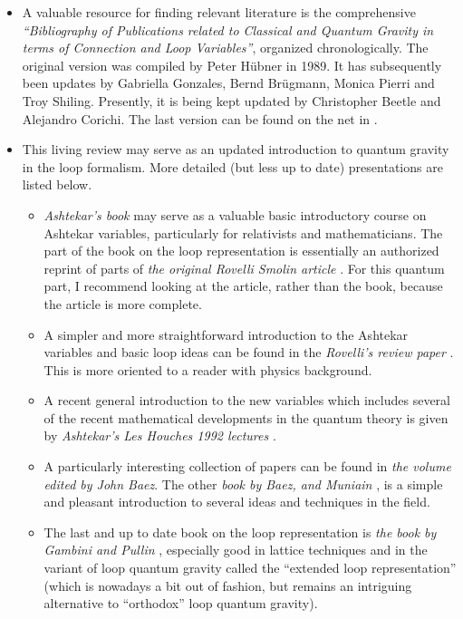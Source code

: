\begin{itemize}

\item A valuable resource for finding relevant literature is the 
comprehensive {\em ``Bibliography of Publications related to Classical 
and Quantum Gravity in terms of Connection and Loop Variables''}, 
organized chronologically.  The original version was compiled by 
Peter H\"ubner in 1989.  It has subsequently been updates by 
Gabriella Gonzales, Bernd Br\"ugmann, Monica Pierri and Troy 
Shiling.  Presently, it is being kept updated by Christopher 
Beetle and Alejandro Corichi.  The last version can be found on 
the net in \cite{Bibliography}.

\item This living review may serve as an updated introduction to 
quantum gravity in the loop formalism. More detailed (but less 
up to date) presentations are listed below. 
\begin{itemize}

\item {\em Ashtekar's book} \cite{AshtekarBook} may serve as a valuable 
basic introductory course on Ashtekar variables, particularly for 
relativists and mathematicians.  The part of the book on the loop 
representation is essentially an authorized reprint of parts of 
{\em the original Rovelli Smolin article} \cite{RovelliSmolin90}.  For 
this quantum part, I recommend looking at the article, rather 
than the book, because the article is more complete.

\item A simpler and more straightforward introduction to the 
Ashtekar variables and basic loop ideas can be found in the 
{\em Rovelli's review paper} \cite{Rovelli91}.  This is more oriented 
to a reader with physics background.

\item A recent general introduction to the new variables which 
includes several of the recent mathematical developments in the 
quantum theory is given by {\em Ashtekar's Les Houches 1992 lectures}  
\cite{AshtekarLesHouches}.

\item A particularly interesting collection of papers can be 
found in {\em the volume \cite{BaezBook1} edited by John Baez}.  The 
other {\em book by Baez, and Muniain} \cite{BaezBook2}, is a simple and 
pleasant introduction to several ideas and techniques in the 
field.

\item The last and up to date book on the loop representation is 
{\em the book by Gambini and Pullin} \cite{GambiniPullinBook}, 
especially good in lattice techniques and in the variant of loop 
quantum gravity called the ``extended loop representation'' 
\cite{Extended,Extended2} (which is nowadays a bit out of fashion, 
but remains an intriguing alternative to ``orthodox'' loop quantum 
gravity).


\end{itemize}
\end{itemize}
